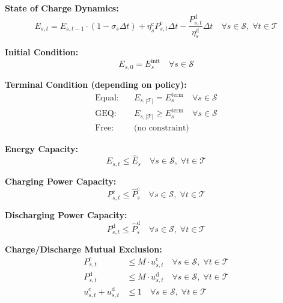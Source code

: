 \documentclass[11pt]{article}
\begin{document}
\textbf{State of Charge Dynamics:}
\begin{equation}
E_{s,t} = E_{s,t-1} \cdot (1 - \sigma_s \Delta t) + \eta_s^{\text{c}} P_{s,t}^{\text{c}} \Delta t - \frac{P_{s,t}^{\text{d}}}{\eta_s^{\text{d}}} \Delta t \quad \forall s \in \mathcal{S}, \; \forall t \in \mathcal{T}
\label{eq:storage_soc}
\end{equation}

\textbf{Initial Condition:}
\begin{equation}
E_{s,0} = E_s^{\text{init}} \quad \forall s \in \mathcal{S}
\label{eq:storage_init}
\end{equation}

\textbf{Terminal Condition (depending on policy):}
\begin{align}
\text{Equal:} \quad & E_{s,|\mathcal{T}|} = E_s^{\text{term}} \quad \forall s \in \mathcal{S} \label{eq:storage_term_equal} \\
\text{GEQ:} \quad & E_{s,|\mathcal{T}|} \geq E_s^{\text{term}} \quad \forall s \in \mathcal{S} \label{eq:storage_term_geq} \\
\text{Free:} \quad & \text{(no constraint)} \label{eq:storage_term_free}
\end{align}

\textbf{Energy Capacity:}
\begin{equation}
E_{s,t} \leq \hat{E}_s \quad \forall s \in \mathcal{S}, \; \forall t \in \mathcal{T}
\label{eq:storage_energy_cap}
\end{equation}

\textbf{Charging Power Capacity:}
\begin{equation}
P_{s,t}^{\text{c}} \leq \hat{P}_s^{\text{c}} \quad \forall s \in \mathcal{S}, \; \forall t \in \mathcal{T}
\label{eq:storage_charge_cap}
\end{equation}

\textbf{Discharging Power Capacity:}
\begin{equation}
P_{s,t}^{\text{d}} \leq \hat{P}_s^{\text{d}} \quad \forall s \in \mathcal{S}, \; \forall t \in \mathcal{T}
\label{eq:storage_discharge_cap}
\end{equation}

\textbf{Charge/Discharge Mutual Exclusion:}
\begin{align}
P_{s,t}^{\text{c}} &\leq M \cdot u_{s,t}^{\text{c}} \quad \forall s \in \mathcal{S}, \; \forall t \in \mathcal{T} \label{eq:storage_charge_binary} \\
P_{s,t}^{\text{d}} &\leq M \cdot u_{s,t}^{\text{d}} \quad \forall s \in \mathcal{S}, \; \forall t \in \mathcal{T} \label{eq:storage_discharge_binary} \\
u_{s,t}^{\text{c}} + u_{s,t}^{\text{d}} &\leq 1 \quad \forall s \in \mathcal{S}, \; \forall t \in \mathcal{T} \label{eq:storage_mutex}
\end{align}
\end{document}
